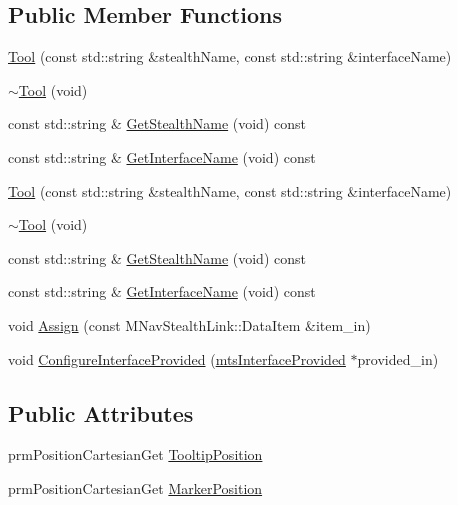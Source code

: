 \subsection*{Public Member Functions}
\begin{DoxyCompactItemize}
\item 
\hyperlink{classmts_medtronic_stealthlink_1_1_tool_a5dcdf7314253cf8a4c34894320a995d5}{Tool} (const std\+::string \&stealth\+Name, const std\+::string \&interface\+Name)
\item 
\hyperlink{classmts_medtronic_stealthlink_1_1_tool_ac161860a5f800b2442e224cbe05d1a9d}{$\sim$\+Tool} (void)
\item 
const std\+::string \& \hyperlink{classmts_medtronic_stealthlink_1_1_tool_a94202828748d5ec14f3bac3986fedf9d}{Get\+Stealth\+Name} (void) const 
\item 
const std\+::string \& \hyperlink{classmts_medtronic_stealthlink_1_1_tool_a715888355806a4f9c0a369cf28175a46}{Get\+Interface\+Name} (void) const 
\item 
\hyperlink{classmts_medtronic_stealthlink_1_1_tool_a5dcdf7314253cf8a4c34894320a995d5}{Tool} (const std\+::string \&stealth\+Name, const std\+::string \&interface\+Name)
\item 
\hyperlink{classmts_medtronic_stealthlink_1_1_tool_ac161860a5f800b2442e224cbe05d1a9d}{$\sim$\+Tool} (void)
\item 
const std\+::string \& \hyperlink{classmts_medtronic_stealthlink_1_1_tool_a94202828748d5ec14f3bac3986fedf9d}{Get\+Stealth\+Name} (void) const 
\item 
const std\+::string \& \hyperlink{classmts_medtronic_stealthlink_1_1_tool_a715888355806a4f9c0a369cf28175a46}{Get\+Interface\+Name} (void) const 
\item 
void \hyperlink{classmts_medtronic_stealthlink_1_1_tool_a2a147aab96afb4ccdb351cc9756e96ff}{Assign} (const M\+Nav\+Stealth\+Link\+::\+Data\+Item \&item\+\_\+in)
\item 
void \hyperlink{classmts_medtronic_stealthlink_1_1_tool_a30c49ba6f30cd8b0528969d2d5faacdc}{Configure\+Interface\+Provided} (\hyperlink{classmts_interface_provided}{mts\+Interface\+Provided} $\ast$provided\+\_\+in)
\end{DoxyCompactItemize}
\subsection*{Public Attributes}
\begin{DoxyCompactItemize}
\item 
prm\+Position\+Cartesian\+Get \hyperlink{classmts_medtronic_stealthlink_1_1_tool_acf9d37a43587bf06a4b596d77feabd9f}{Tooltip\+Position}
\item 
prm\+Position\+Cartesian\+Get \hyperlink{classmts_medtronic_stealthlink_1_1_tool_ac1e88de569626cdb66f345ebeffc6228}{Marker\+Position}
\end{DoxyCompactItemize}
